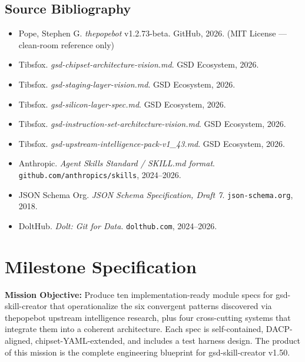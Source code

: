 \documentclass[11pt,letterpaper]{article}
\newcommand{\stageheader}[2]{%
  \noindent\colorbox{#2}{\makebox[\textwidth][l]{%
    \textcolor{white}{\bfseries\sffamily\hspace{6pt}#1\hspace{6pt}}}}%
  \vspace{0.5em}\par%
}
\begin{document}
\subsection{Source Bibliography}

\begin{itemize}[noitemsep]
  \item Pope, Stephen G. \textit{thepopebot} v1.2.73-beta. GitHub, 2026. (MIT License --- clean-room reference only)
  \item Tibsfox. \textit{gsd-chipset-architecture-vision.md}. GSD Ecosystem, 2026.
  \item Tibsfox. \textit{gsd-staging-layer-vision.md}. GSD Ecosystem, 2026.
  \item Tibsfox. \textit{gsd-silicon-layer-spec.md}. GSD Ecosystem, 2026.
  \item Tibsfox. \textit{gsd-instruction-set-architecture-vision.md}. GSD Ecosystem, 2026.
  \item Tibsfox. \textit{gsd-upstream-intelligence-pack-v1\_43.md}. GSD Ecosystem, 2026.
  \item Anthropic. \textit{Agent Skills Standard / SKILL.md format}. \texttt{github.com/anthropics/skills}, 2024--2026.
  \item JSON Schema Org. \textit{JSON Schema Specification, Draft 7}. \texttt{json-schema.org}, 2018.
  \item DoltHub. \textit{Dolt: Git for Data}. \texttt{dolthub.com}, 2024--2026.
\end{itemize}

\newpage

\stageheader{STAGE 3 --- MISSION PACKAGE}{tertiary}

\section{Milestone Specification}

\textbf{Mission Objective:} Produce ten implementation-ready module specs for gsd-skill-creator that operationalize the six convergent patterns discovered via thepopebot upstream intelligence research, plus four cross-cutting systems that integrate them into a coherent architecture. Each spec is self-contained, DACP-aligned, chipset-YAML-extended, and includes a test harness design. The product of this mission is the complete engineering blueprint for gsd-skill-creator v1.50.
\end{document}
